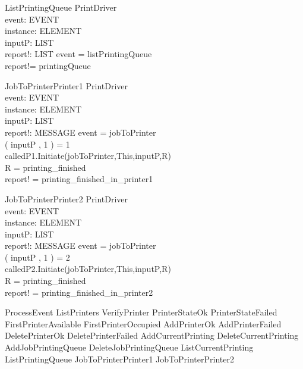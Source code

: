 \begin{schema}{ListPrintingQueue}
\Delta PrintDriver \\
event: EVENT \\
instance: ELEMENT \\
inputP: LIST \\
report!: LIST
\where event = listPrintingQueue \\
report!= printingQueue
\end{schema}


\begin{schema}{JobToPrinterPrinter1}
\Delta PrintDriver \\
event: EVENT \\
instance: ELEMENT \\
inputP: LIST \\
report!: MESSAGE
\where event = jobToPrinter \\
\nth( inputP , 1 ) = 1 \\
calledP1.Initiate(jobToPrinter,This,inputP,R) \\
R = printing\_finished \\
report! = printing\_finished\_in\_printer1
\end{schema}

\begin{schema}{JobToPrinterPrinter2}
\Delta PrintDriver \\
event: EVENT \\
instance: ELEMENT \\
inputP: LIST \\
report!: MESSAGE
\where event = jobToPrinter \\
\nth( inputP , 1 ) = 2 \\
calledP2.Initiate(jobToPrinter,This,inputP,R) \\
R = printing\_finished \\
report! = printing\_finished\_in\_printer2

\end{schema}


\begin{zed}
ProcessEvent 
             \sdef ListPrinters 
             \lor VerifyPrinter
             \lor PrinterStateOk
             \lor PrinterStateFailed
             \lor FirstPrinterAvailable
             \lor FirstPrinterOccupied
             \lor AddPrinterOk
             \lor AddPrinterFailed
             \lor DeletePrinterOk
             \lor DeletePrinterFailed
             \lor AddCurrentPrinting
             \lor DeleteCurrentPrinting
             \lor AddJobPrintingQueue
             \lor DeleteJobPrintingQueue
             \lor ListCurrentPrinting
             \lor ListPrintingQueue
             \lor JobToPrinterPrinter1
             \lor JobToPrinterPrinter2
\end{zed}